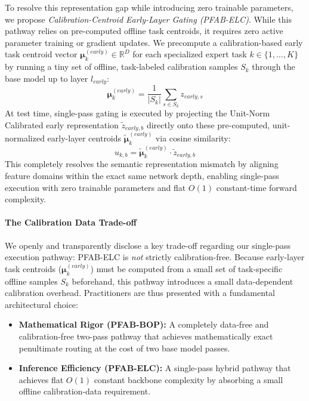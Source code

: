 To resolve this representation gap while introducing zero trainable parameters, we propose \emph{Calibration-Centroid Early-Layer Gating (PFAB-ELC)}. While this pathway relies on pre-computed offline task centroids, it requires zero active parameter training or gradient updates. We precompute a calibration-based early task centroid vector $\boldsymbol{\mu}_k^{(early)} \in \mathbb{R}^D$ for each specialized expert task $k \in \{1, \dots, K\}$ by running a tiny set of offline, task-labeled calibration samples $S_k$ through the base model up to layer $l_{early}$:
\begin{equation}
  \boldsymbol{\mu}_k^{(early)} = \frac{1}{|S_k|} \sum_{s \in S_k} z_{early, s}
\end{equation}
At test time, single-pass gating is executed by projecting the Unit-Norm Calibrated early representation $\tilde{z}_{early, b}$ directly onto these pre-computed, unit-normalized early-layer centroids $\tilde{\boldsymbol{\mu}}_k^{(early)}$ via cosine similarity:
\begin{equation}
  u_{k, b} = \tilde{\boldsymbol{\mu}}_k^{(early)} \cdot \tilde{z}_{early, b}
\end{equation}
This completely resolves the semantic representation mismatch by aligning feature domains within the exact same network depth, enabling single-pass execution with zero trainable parameters and flat $O(1)$ constant-time forward complexity.

\paragraph{The Calibration Data Trade-off}
We openly and transparently disclose a key trade-off regarding our single-pass execution pathway: \textsc{PFAB-ELC} is \emph{not} strictly calibration-free. Because early-layer task centroids ($\boldsymbol{\mu}_k^{(early)}$) must be computed from a small set of task-specific offline samples $S_k$ beforehand, this pathway introduces a small data-dependent calibration overhead. Practitioners are thus presented with a fundamental architectural choice:
\begin{itemize}
  \item \textbf{Mathematical Rigor (PFAB-BOP):} A completely data-free and calibration-free two-pass pathway that achieves mathematically exact penultimate routing at the cost of two base model passes.
  \item \textbf{Inference Efficiency (PFAB-ELC):} A single-pass hybrid pathway that achieves flat $O(1)$ constant backbone complexity by absorbing a small offline calibration-data requirement.
\end{itemize}

